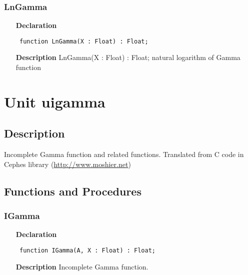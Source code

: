 \documentclass[12pt,a4paper,oneside]{report}
\newcommand{\declarationitem}[1]{\textbf{#1}}
\newcommand{\descriptiontitle}[1]{\textbf{#1}}
\newcommand{\code}[1]{\texttt{#1}}
\begin{document}
\subsubsection{LnGamma}
\label{ugamma-LnGamma}
\begin{itemize}\item[\declarationitem{Declaration}\hfill]
	\begin{flushleft}
		\code{
			function LnGamma(X : Float) : Float;}
		
	\end{flushleft}
	
	\par
	\item[\descriptiontitle{Description}]
	LnGamma(X : Float) : Float; natural logarithm of Gamma function
	
\end{itemize}
\section{Unit uigamma}
\label{uigamma}
\subsection{Description}
Incomplete Gamma function and related functions. Translated from C code in Cephes library (\href{http://www.moshier.net}{http://www.moshier.net}) \subsection{Functions and Procedures}
\subsubsection{IGamma}
\label{uigamma-IGamma}
\begin{itemize}\item[\declarationitem{Declaration}\hfill]
	\begin{flushleft}
		\code{
			function IGamma(A, X : Float) : Float;}
		
	\end{flushleft}
	
	\par
	\item[\descriptiontitle{Description}]
	Incomplete Gamma function.
	
\end{itemize}
\end{document}

